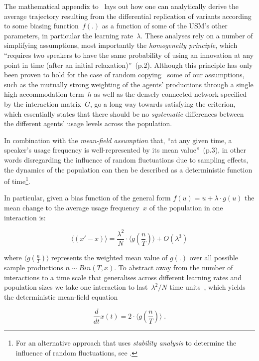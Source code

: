 The mathematical appendix to~\citet{Blythe2012} lays out how one can analytically derive the average trajectory resulting from the differential replication of variants according to some biasing function~$f(.)$ as a function of some of the USM's other parameters, in particular the learning rate~$\lambda$. These analyses rely on a number of simplifying assumptions, most importantly the \emph{homogeneity principle}, which ``requires two speakers to have the same probability of using an innovation at any point in time (after an initial relaxation)''~(p.2).
Although this principle has only been proven to hold for the case of random copying~\citep{Blythe2010} some of our assumptions, such as the mutually strong weighting of the agents' productions through a single high accommodation term~$h$ as well as the densely connected network specified by the interaction matrix~$G$, go a long way towards satisfying the criterion, which essentially states that there should be no \emph{systematic} differences between the different agents' usage levels across the population.

In combination with the \emph{mean-field assumption} that, ``at any given time, a speaker’s usage frequency is well-represented by its mean value''~(p.3), in other words disregarding the influence of random fluctuations due to sampling effects, the dynamics of the population can then be described as a deterministic function of time\footnote{For an alternative approach that uses \emph{stability analysis} to determine the influence of random fluctuations, see \citet{Renton2016}.}.

In particular, given a bias function of the general form $f(u)=u+\lambda\cdot g(u)$ the mean change to the average usage frequency~$x$ of the population in one interaction is:

$$\langle(x'-x)\rangle=\frac{\lambda^2}{N}\cdot\langle g(\frac{n}{T})\rangle + O(\lambda^3)$$

where $\langle g(\frac{n}{T})\rangle$ represents the weighted mean value of $g(.)$ over all possible sample productions $n\sim Bin(T,x)$.
To abstract away from the number of interactions to a time scale that generalises across different learning rates and population sizes we take one interaction to last~$\lambda^2/N$ time units~\citep[see][]{Baxter2006,Baxter2009}, which yields the deterministic mean-field equation

$$\frac{d}{dt}x(t)=2\cdot\langle g(\frac{n}{T})\rangle\;.$$


